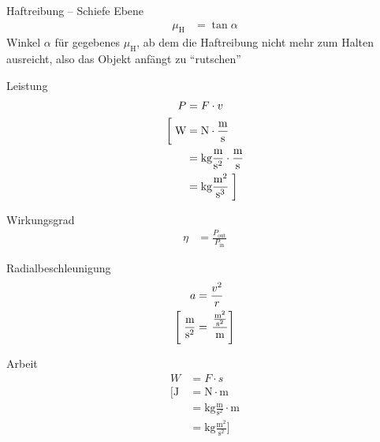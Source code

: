 \begin{karte}{Haftreibung -- Schiefe Ebene}
    \begin{align*}
        \mu_\text{H} &= \tan \alpha
    \end{align*}
    Winkel \(\alpha\) für gegebenes \( \mu_\text{H} \), ab dem die Haftreibung nicht mehr zum Halten ausreicht, also das Objekt anfängt zu ``rutschen''
\end{karte}

\begin{karte}{Leistung}
    \begin{align*}
        P &= F \cdot v \\
        \left[ \vphantom{\frac{m^2}{s^3}} \right.
            \text{W} &= 
            \text{N} \cdot \frac{\text{m}}{\text{s}} \\
            &= \text{kg} \frac{\text{m}}{\text{s}^2} \cdot \frac{\text{m}}{\text{s}} \\
            &= \text{kg} \frac{\text{m}^2}{\text{s}^3} 
            \left. \vphantom{\frac{m^2}{s^3}} \right]
    \end{align*}
\end{karte}

\begin{karte}{Wirkungsgrad}
    \begin{align*}
        \eta &= \frac{P_\text{out}}{P_\text{in}}
    \end{align*}
\end{karte}

\begin{karte}{Radialbeschleunigung}
    \begin{align*}
        a &= \frac{v^2}{r} \\
        \left[ \vphantom{\frac{\frac{\text{m}^2}{\text{s}^2}}{\text{m}}} \right.
            \frac{\text{m}}{\text{s}^2} &= \left.  \frac{\frac{\text{m}^2}{\text{s}^2}}{\text{m}} 
             \right]
    \end{align*}
\end{karte}

\begin{karte}{Arbeit}
    \begin{align*}
        W &= F \cdot s \\
        \bigg[
            \text{J} &= \text{N} \cdot \text{m} \\
            &= \text{kg}\frac{\text{m}}{\text{s}^2} \cdot \text{m}\\
            &= \text{kg}\frac{\text{m}^2}{\text{s}^2}  
            \bigg]
    \end{align*}
\end{karte}

